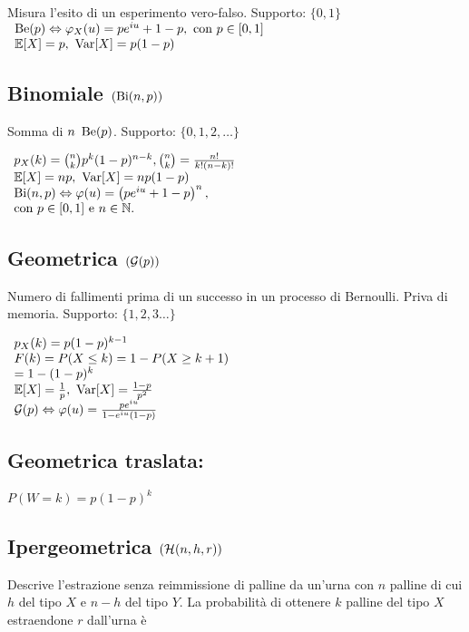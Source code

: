 Misura l'esito di un esperimento vero-falso. Supporto: $\{0,1\}$ $ \begin{array}{l}
\operatorname{Be} (p)\Leftrightarrow \varphi_X (u)=pe^{iu} +1-p,\ \text{con} \ p\in [0,1]\\
\mathbb E[X]=p,\ \operatorname{Var}[X]=p(1-p)
\end{array}$
\subsection{Binomiale $(\operatorname{Bi} (n,p))$}

Somma di $n\ \operatorname{Be} (p)$. Supporto: $\{0,1,2,\dotsc \}$

$ \begin{array}{l}
p_X(k) =\binom{n}{k} p^k (1-p)^{n-k} ,\binom{n}{k} =\frac{n!}{k!(n-k)!}\\
\mathbb E[X]=np,\ \operatorname{Var}[X]=np(1-p)\\
\operatorname{Bi} (n,p)\Leftrightarrow \varphi (u)=\left( pe^{iu} +1-p\right)^n ,\\
\text{con} \ p\in [0,1]\ \text{e} \ n\in \mathbb N .
\end{array}$
\subsection{Geometrica $(\mathcal G (p))$}

Numero di fallimenti prima di un successo in un processo di Bernoulli. Priva di memoria. Supporto: $\{1,2,3\dotsc \}$

$ \begin{array}{l}
p_X(k) =p(1-p)^{k-1}\\
F(k)=P(X\leq k)=1-P(X\geq k+1)\\
=1-(1-p)^k\\
\mathbb E[X]=\frac{1}{p} ,\ \operatorname{Var}[X]=\frac{1-p}{p^2}\\
\mathcal G (p)\Leftrightarrow \varphi (u)=\frac{pe^{iu}}{1-e^{iu} (1-p)}
\end{array}$
\subsection{Geometrica traslata:}

$P(W=k)=p(1-p)^k$
\subsection{Ipergeometrica $(\mathcal H (n,h,r))$}

Descrive l'estrazione senza reimmissione di palline da un'urna con $n$ palline di cui $h$ del tipo $X$ e $n-h$ del tipo $Y$. La probabilità di ottenere $k$ palline del tipo $X$ estraendone $r$ dall'urna è

